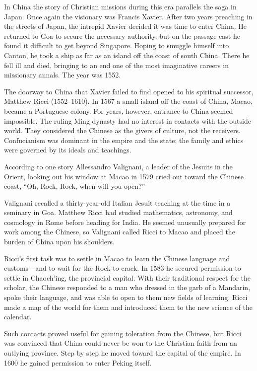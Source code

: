 In China the story of Christian missions during this era parallels the saga in Japan. Once again the
visionary was Francis Xavier. After two years preaching in the streets of Japan, the intrepid Xavier
decided it was time to enter China. He returned to Goa to secure the necessary authority, but on the
passage east he found it difficult to get beyond Singapore. Hoping to smuggle himself into Canton,
he took a ship as far as an island off the coast of south China. There he fell ill and died,
bringing to an end one of the most imaginative careers in missionary annals. The year was 1552.

The doorway to China that Xavier failed to find opened to his spiritual successor, Matthew Ricci
(1552–1610). In 1567 a small island off the coast of China, Macao, became a Portuguese colony. For
years, however, entrance to China seemed impossible. The ruling Ming dynasty had no interest in
contacts with the outside world. They considered the Chinese as the givers of culture, not the
receivers. Confucianism was dominant in the empire and the state; the family and ethics were
governed by its ideals and teachings.

According to one story Allessandro Valignani, a leader of the Jesuits in the Orient, looking out his
window at Macao in 1579 cried out toward the Chinese coast, “Oh, Rock, Rock, when will you open?”

Valignani recalled a thirty-year-old Italian Jesuit teaching at the time in a seminary in Goa.
Matthew Ricci had studied mathematics, astronomy, and cosmology in Rome before heading for India. He
seemed unusually prepared for work among the Chinese, so Valignani called Ricci to Macao and placed
the burden of China upon his shoulders.

Ricci’s first task was to settle in Macao to learn the Chinese language and customs—and to wait for
the Rock to crack. In 1583 he secured permission to settle in Chaoch’ing, the provincial capital.
With their traditional respect for the scholar, the Chinese responded to a man who dressed in the
garb of a Mandarin, spoke their language, and was able to open to them new fields of learning. Ricci
made a map of the world for them and introduced them to the new science of the calendar.

Such contacts proved useful for gaining toleration from the Chinese, but Ricci was convinced that
China could never be won to the Christian faith from an outlying province. Step by step he moved
toward the capital of the empire. In 1600 he gained permission to enter Peking itself.

